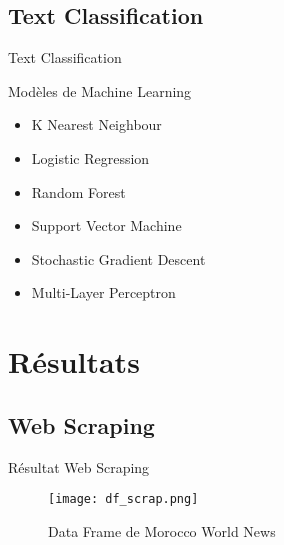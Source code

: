 \documentclass[10pt,sans,usenames,dvipsnames,english,compress]{beamer}
\begin{document}
\subsection{Text Classification}
\begin{frame}{Text Classification}
	\begin{exampleblock}{Modèles de Machine Learning}
            \begin{itemize}
            \item K Nearest Neighbour
            \item Logistic Regression
            \item Random Forest
            \item Support Vector Machine
            \item Stochastic Gradient Descent
            \item Multi-Layer Perceptron
            \end{itemize}
	\end{exampleblock}

\end{frame}

\section{Résultats}
\subsection{Web Scraping}
\begin{frame}{Résultat Web Scraping}
    \begin{figure}[!h]
    \centering
    \texttt{[image: df\_scrap.png]}
    \caption{Data Frame de Morocco World News}
    \end{figure}
\end{frame}
\end{document}
